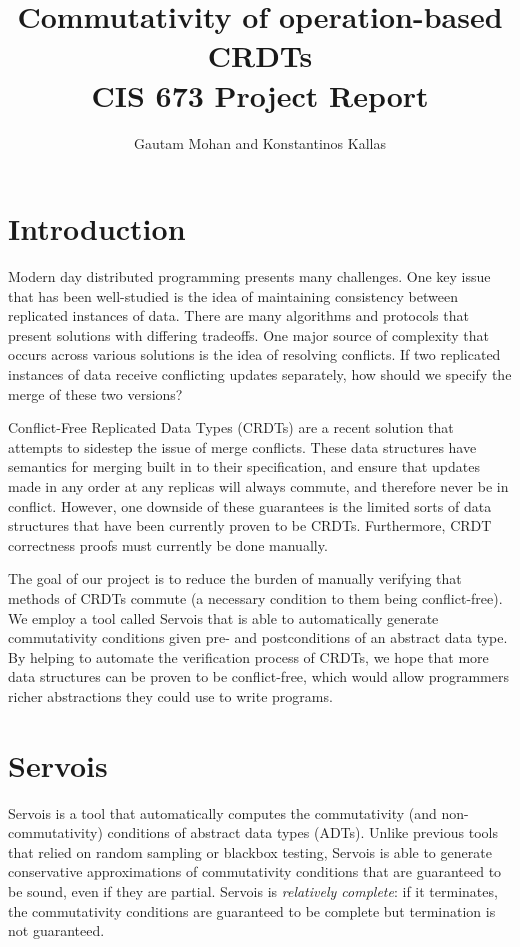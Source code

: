\documentclass{article}
\begin{document}
\title{Commutativity of operation-based CRDTs \\ CIS 673 Project Report}
\author{Gautam Mohan and Konstantinos Kallas}


\maketitle

\section{Introduction}

Modern day distributed programming presents many challenges. One
key issue that has been well-studied is the idea of maintaining consistency
between replicated instances of data. There are many algorithms and
protocols that present solutions with differing tradeoffs. One major
source of complexity that occurs across various solutions is the idea of
resolving conflicts. If two replicated instances of data receive conflicting
updates separately, how should we specify the merge of these two versions?

Conflict-Free Replicated Data Types (CRDTs) are a recent solution that attempts
to sidestep the issue of merge conflicts. These data structures have semantics
for merging built in to their specification, and ensure that updates made in any
order at any replicas will always commute, and therefore never be in conflict.
However, one downside of these guarantees is the limited sorts of data
structures that have been currently proven to be CRDTs. Furthermore, CRDT
correctness proofs must currently be done manually.

The goal of our project is to reduce the burden of manually verifying that
methods of CRDTs commute (a necessary condition to them being conflict-free). We
employ a tool called Servois that is able to automatically generate
commutativity conditions given pre- and postconditions of an abstract data type.
By helping to automate the verification process of CRDTs, we hope that more data
structures can be proven to be conflict-free, which would allow programmers
richer abstractions they could use to write programs.

\section{Servois}

Servois \cite{Bansal2018Servois} is a tool that automatically computes the
commutativity (and non-commutativity) conditions of abstract data types (ADTs). Unlike
previous tools that relied on random sampling or blackbox testing, Servois is
able to generate conservative approximations of commutativity conditions that
are guaranteed to be sound, even if they are partial. Servois is
\textit{relatively complete}: if it terminates, the commutativity conditions are
guaranteed to be complete but termination is not guaranteed.
\end{document}
